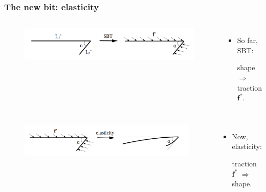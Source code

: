 \documentclass{beamer}
\newcommand{\bi}{\begin{itemize}}
\newcommand{\ei}{\end{itemize}}
\begin{document}
\begin{frame}
	\frametitle{The new bit: elasticity}
	\begin{overlayarea}{\textwidth}{\textheight}
		\vspace{-0.5cm}
		\begin{columns}
				\vspace{-0.5cm}
			\begin{figure}[htb]
				\begin{center}
					\includegraphics[width=1.05\textwidth]{plots/schematic/shape_to_traction.png}
				\end{center}
			\end{figure}
			\bi 
			\item \small So far, SBT:
			
			shape $\Longrightarrow$ traction $\mathbf{f}^*$.
			\ei
		\end{columns}
		\begin{columns}
				\vspace{-1cm}
			\begin{figure}[htb]
				\begin{center}
					\includegraphics[width=1.05\textwidth]{plots/schematic/traction_to_shape.png}
				\end{center}
			\end{figure}
			\vspace{-0.1cm}
			\bi 
			\item \small Now, elasticity:
			
			traction $\mathbf{f}^*$ $\Longrightarrow$ shape.
			\ei
		\end{columns}\vspace{0.2cm}
	\end{overlayarea}
\end{frame}
\end{document}
